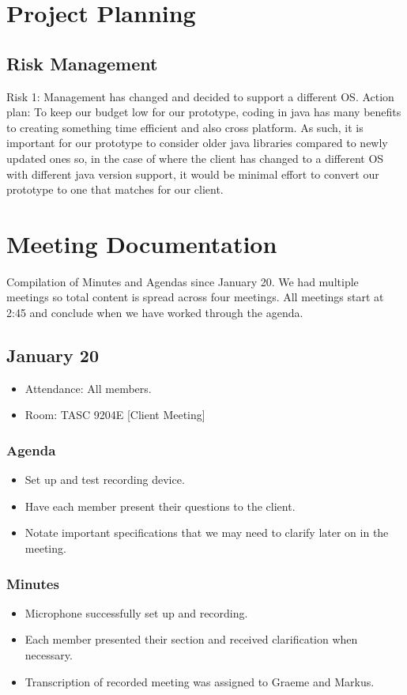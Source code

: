 \documentclass{article}
\begin{document}
\section{Project Planning}
\subsection{Risk Management}
Risk 1: Management has changed and decided to support a different OS.
Action plan: To keep our budget low for our prototype, coding in java has many benefits to creating something time efficient and also cross platform.
As such, it is important for our prototype to consider older java libraries compared to newly updated ones so, in the case of 
where the client has changed to a different OS with different java version support, it would be minimal effort to convert our prototype
to one that matches for our client.

\section{Meeting Documentation}
Compilation of Minutes and Agendas since January 20.  We had multiple meetings
 so total content is spread across four meetings.  All meetings start at 2:45 
 and conclude when we have worked through the agenda.

\subsection{January 20}
\begin{itemize}
\item Attendance: All members.
\item Room: TASC 9204E [Client Meeting]
\end{itemize}
\subsubsection{Agenda}
\begin{itemize}
\item Set up and test recording device.
\item Have each member present their questions to the client.
\item Notate important specifications that we may need to clarify later on in
 the meeting.
\end{itemize}
\subsubsection{Minutes}
\begin{itemize}
\item Microphone successfully set up and recording.
\item Each member presented their section and received clarification 
when necessary.
\item Transcription of recorded meeting was assigned to Graeme and Markus.
\end{itemize}
\end{document}
